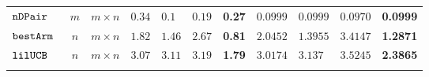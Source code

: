{\begin {table}[t]
\begin{center}
{\begin{tabular}{|| >{\tiny}l || c | c || c | l | c | r || c | l | c | r || }
        \hhline{||-||---||-||--||----||}
        $\mathtt{nDPair}$~\cite{Jamieson2015TheAO} & $ m $ & $  m \times n  $   & $0.34$  & $0.1$ & $0.19$ & \textbf{0.27} & $0.0999$   & $0.0999$ & $0.0970$ & \textbf{0.0999}   \\
        \hhline{||-||---||-||--||----||}
        $\mathtt{bestArm}$~\cite{Jamieson2015TheAO} & $ n $ & $  m \times n $  & $1.82$  & $1.46$ & $2.67$ & \textbf{0.81}& $ 2.0452$   & $ 1.3955$ & {{$3.4147$}} & \textbf{1.2871} \\
        \hhline{||-||---||-||--||----||}
        $\mathtt{lilUCB}$~\cite{Jamieson2015TheAO} & $ n $ & $ m \times n $ & $3.07$  & $3.11$ & $3.19$ & \textbf{1.79}& $3.0174$   & $ 3.137$ & {$3.5245$} & \textbf{2.3865}   \\
        \hhline{|:t=========== t:|}
\end{tabular}
}
\end{center}
\vspace{-0.5cm}
\end{table}
}




